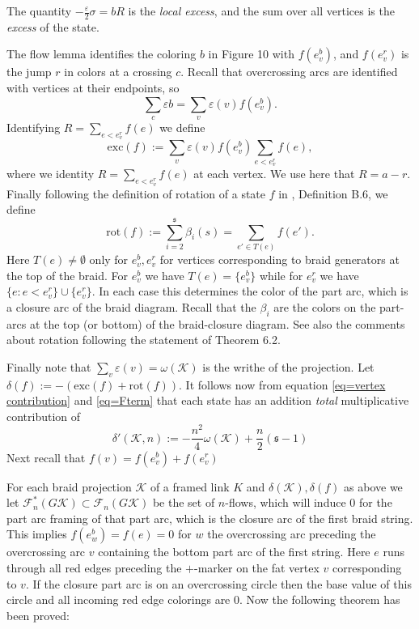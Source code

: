 \documentclass[11pt]{article}
\theoremstyle{definition}
\theoremstyle{remark}
\theoremstyle{remark}
\begin{document}
The quantity $-\frac{\varepsilon }{2}\sigma =bR$ is the \textit{local excess}, and the sum over all vertices is the \textit{excess} of the state.

The flow lemma identifies the coloring $b$ in Figure 10 with $f(e_v^b)$, and $f(e_v^r)$ is the jump $r$ in colors at a crossing $c$. Recall that overcrossing arcs are identified with vertices at their endpoints, so
$$\sum_c \varepsilon b=\sum_v \varepsilon (v) f(e_v^b).$$
Identifying $R=\sum_{e<e_v^r}f(e)$ we define
$$\textrm{exc}(f):=\sum_v\varepsilon (v)f(e_v^b)\sum_{e<e_v^r}f(e),$$
where we identity $R=\sum_{e<e_v^r}f(e)$ at each vertex. We use here that $R=a-r$.
Finally following the definition of rotation of a state $f$ in \cite{GL}, Definition B.6, we define
$$\textrm{rot}(f):=\sum_{i=2}^{\mathfrak{s}} \beta_i(s)=\sum_{e'\in T(e)}f(e').$$
Here $T(e)\neq \emptyset $ only for $e_v^b,e_v^r$ for vertices corresponding to braid generators 
at the top of the braid. For $e_v^b$ we have $T(e)=\{e_v^b\}$ while for $e_v^r$ we have 
$\{e: e<e_v^r\}\cup \{e_v^r\}$. In each case this determines the color of the part arc, which is a closure arc of the braid diagram. 
Recall that the $\beta_i$ are the colors on the part-arcs at the top (or bottom) of the braid-closure diagram.
See also the comments about rotation following the statement of Theorem 6.2.

Finally note that $\sum_v\varepsilon (v)=\omega (\mathcal{K})$ is the writhe of the projection. 
Let $\delta (f):=-(\textrm{exc}(f)+\textrm{rot}(f))$.
It follows now from equation \eqref{eq=vertex contribution} and \eqref{eq=Fterm} that each state has an addition \textit{total} multiplicative contribution of
\begin{equation} 
\delta '(\mathcal{K},n):=-\frac{n^2}{4}\omega (\mathcal{K})+\frac{n}{2}(\mathfrak{s}-1)
\end{equation}
Next recall that $f(v)=f(e_v^b)+f(e_v^r)$

For each braid projection $\mathcal{K}$ of a framed link $K$ and $\delta (\mathcal{K}), \delta (f)$ as above we let
$\mathcal{F}_{n}^*(G\mathcal{K})\subset \mathcal{F}_{n}(G\mathcal{K})$ be the set of $n$-flows, which will induce $0$ for the part arc framing of that part arc, which is the closure arc of the first braid string. This implies $f(e_w^b)=f(e)=0$ for $w$ the overcrossing arc preceding the overcrossing arc $v$ containing the bottom part arc of the first string. Here $e$ runs through all red edges preceding the $+$-marker on the fat vertex $v$ corresponding to $v$. If the closure part arc is on an overcrossing circle then the base value of this circle and all incoming red edge colorings are $0$. Now the following theorem has been proved:
\end{document}
